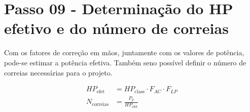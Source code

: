 \section{Passo 09 - Determinação do HP efetivo e do número de correias}

Com os fatores de correção em mãos, juntamente com os valores de potência, pode-se estimar a potência efetiva.
Também seno possível definir o número de correias necessárias para o projeto.


\begin{align}
    HP_{\text{efet}} &= HP_{\text{class}} \cdot F_{AC} \cdot F_{LP} \\
    N_{\text{correias}} &= \frac{P_p}{HP_{\text{efet}}}
\end{align}

